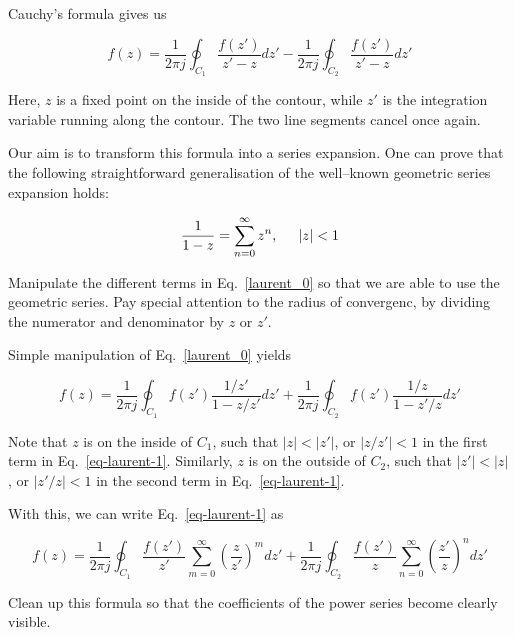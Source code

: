 Cauchy's formula gives us

\begin{equation}
f(z)=\frac{1}{2 \pi j }\oint_{{C}_1} \frac{f(z')} {z'-z} dz' -\frac{1}{2
\pi j }\oint_{{C}_2} \frac{f(z')} {z'-z} dz' \label{laurent_0}
\end{equation} 

Here, $z$ is a fixed point on the inside of the contour, while $z'$ is the integration variable running along the contour. The two line segments cancel once again.

Our aim is to transform this formula into a series expansion. One can prove that the following straightforward generalisation of the well--known geometric series expansion holds:

\begin{equation}
\frac{1}{1-z} = \sum_{n=0}^\infty z^n, \hspace{.5cm} |z| < 1
\end{equation}

\begin{cue}
Manipulate the different terms in Eq.~\ref{laurent_0} so that we are able to use the geometric series. Pay special attention to the radius of convergenc, by dividing the numerator and denominator by $z$ or $z'$.
\end{cue}

Simple manipulation of Eq.~\ref{laurent_0} yields

\begin{equation}
f(z)=\frac{1}{2 \pi j }\oint_{{C}_1} f(z') \frac{1 / z'} {1-z / z'} dz' + \frac{1}{2 \pi j }\oint_{{C}_2} f(z') \frac{1 / z} {1 - z' / z} dz'
\label{eq-laurent-1}
\end{equation} 

Note that $z$ is on the inside of ${C}_1$, such that $| z | < |z'| $, or $ |z / z' | < 1$ in the first term in Eq.~\ref{eq-laurent-1}. Similarly, $z$ is on the outside of ${C}_2$, such that $|z'| < | z | $, or $ |z'  / z| <
1$ in the second term in Eq.~\ref{eq-laurent-1}.

With this, we can write Eq.~\ref{eq-laurent-1} as

\begin{equation}
f(z)=\frac{1}{2 \pi j }\oint_{{C}_1} \frac{f(z')}{z'} \sum_{m=0}^{\infty} \left( \frac{z}{z'}\right)^m dz' + \frac{1}{2 \pi j }\oint_{{C}_2} \frac{f(z')}{z} \sum_{n=0}^{\infty} \left(\frac{z'}{z}\right)^n dz'
\end{equation}

\begin{cue}
Clean up this formula so that the coefficients of the power series become clearly visible.
\end{cue}

